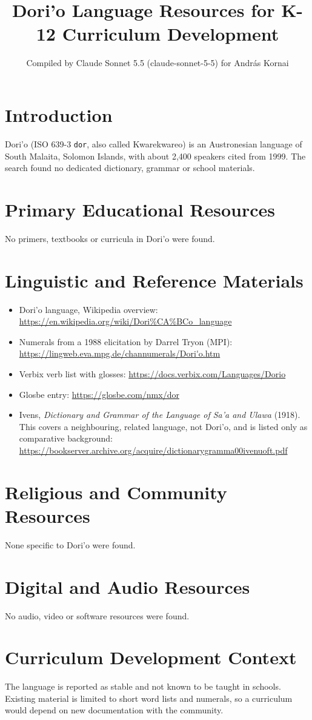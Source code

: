 \documentclass[12pt]{article}
\title{Dori'o Language Resources for K-12 Curriculum Development}
\author{Compiled by Claude Sonnet 5.5 (claude-sonnet-5-5) for Andr\'as Kornai}
\date{}
\begin{document}
\maketitle

\section{Introduction}
Dori'o (ISO 639-3 \texttt{dor}, also called Kwarekwareo) is an Austronesian language of South Malaita, Solomon Islands, with about 2,400 speakers cited from 1999. The search found no dedicated dictionary, grammar or school materials.

\section{Primary Educational Resources}
No primers, textbooks or curricula in Dori'o were found.

\section{Linguistic and Reference Materials}
\begin{itemize}
\item Dori'o language, Wikipedia overview: \url{https://en.wikipedia.org/wiki/Dori%CA%BCo_language}
\item Numerals from a 1988 elicitation by Darrel Tryon (MPI): \url{https://lingweb.eva.mpg.de/channumerals/Dori'o.htm}
\item Verbix verb list with glosses: \url{https://docs.verbix.com/Languages/Dorio}
\item Glosbe entry: \url{https://glosbe.com/nmx/dor}
\item Ivens, \emph{Dictionary and Grammar of the Language of Sa'a and Ulawa} (1918). This covers a neighbouring, related language, not Dori'o, and is listed only as comparative background: \url{https://bookserver.archive.org/acquire/dictionarygramma00ivenuoft.pdf}
\end{itemize}

\section{Religious and Community Resources}
None specific to Dori'o were found.

\section{Digital and Audio Resources}
No audio, video or software resources were found.

\section{Curriculum Development Context}
The language is reported as stable and not known to be taught in schools. Existing material is limited to short word lists and numerals, so a curriculum would depend on new documentation with the community.
\end{document}
